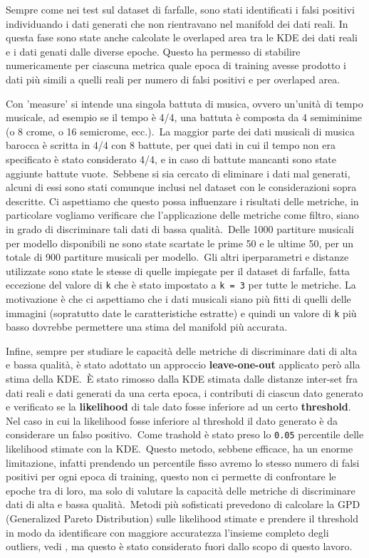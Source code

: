 Sempre come nei test sul dataset di farfalle, sono stati identificati i falsi positivi individuando i dati generati che non rientravano nel manifold dei dati reali. In questa fase sono state anche calcolate le overlaped area tra le KDE dei dati reali e i dati genati dalle diverse epoche. 
Questo ha permesso di stabilire numericamente per ciascuna metrica quale epoca di training avesse prodotto i dati più simili a quelli reali per numero di falsi positivi e per overlaped area.\ 

Con 'measure' si intende una singola battuta di musica, ovvero un'unità di tempo musicale, ad esempio se il tempo è 4/4, una battuta è composta da 4 semiminime (o 8 crome, o 16 semicrome, ecc.).\
La maggior parte dei dati musicali di musica barocca è scritta in 4/4 con 8 battute, per quei dati in cui il tempo non era specificato è stato considerato 4/4, e in caso di battute mancanti sono state aggiunte battute vuote.\
Sebbene si sia cercato di eliminare i dati mal generati, alcuni di essi sono stati comunque inclusi nel dataset con le considerazioni sopra descritte. Ci aspettiamo che questo possa influenzare i risultati delle metriche, in particolare vogliamo verificare che l'applicazione delle metriche come filtro, siano in grado di discriminare tali dati di bassa qualità.\
Delle 1000 partiture musicali per modello disponibili ne sono state scartate le prime 50 e le ultime 50, per un totale di 900 partiture musicali per modello.\
Gli altri iperparametri e distanze utilizzate sono state le stesse di quelle impiegate per il dataset di farfalle, fatta eccezione del valore di \texttt{k} che è stato impostato a \texttt{k = 3} per tutte le metriche. La motivazione è che ci aspettiamo che i dati musicali siano più fitti di quelli delle immagini (sopratutto date le caratteristiche estratte) e quindi un valore di \texttt{k} più basso dovrebbe permettere una stima del manifold più accurata.\

Infine, sempre per studiare le capacità delle metriche di discriminare dati di alta e bassa qualità, è stato adottato un approccio \textbf{leave-one-out} applicato però alla stima della KDE.\
È stato rimosso dalla KDE stimata dalle distanze inter-set fra dati reali e dati generati da una certa epoca, i contributi di ciascun dato generato e verificato se la \textbf{likelihood} di tale dato fosse inferiore ad un certo \textbf{threshold}.
Nel caso in cui la likelihood fosse inferiore al threshold il dato generato è da considerare un falso positivo.\
Come trashold è stato preso lo \texttt{0.05} percentile delle likelihood stimate con la KDE.\
Questo metodo, sebbene efficace, ha un enorme limitazione, infatti prendendo un percentile fisso avremo lo stesso numero di falsi positivi per ogni epoca di training, questo non ci permette di confrontare le epoche tra di loro, ma solo di valutare la capacità delle metriche di discriminare dati di alta e bassa qualità.\
Metodi più sofisticati prevedono di calcolare la GPD (Generalized Pareto Distribution) sulle likelihood stimate e prendere il threshold in modo da identificare con maggiore accuratezza l'insieme completo degli outliers, vedi \cite{9LeaveOneOut}, ma questo è stato considerato fuori dallo scopo di questo lavoro.
